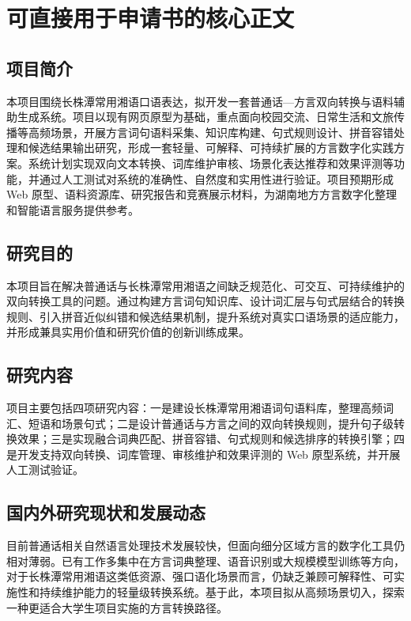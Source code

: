 \documentclass[12pt,a4paper]{ctexart}
\begin{document}
\section{可直接用于申请书的核心正文}

\subsection{项目简介}

本项目围绕长株潭常用湘语口语表达，拟开发一套普通话—方言双向转换与语料辅助生成系统。项目以现有网页原型为基础，重点面向校园交流、日常生活和文旅传播等高频场景，开展方言词句语料采集、知识库构建、句式规则设计、拼音容错处理和候选结果输出研究，形成一套轻量、可解释、可持续扩展的方言数字化实践方案。系统计划实现双向文本转换、词库维护审核、场景化表达推荐和效果评测等功能，并通过人工测试对系统的准确性、自然度和实用性进行验证。项目预期形成 Web 原型、语料资源库、研究报告和竞赛展示材料，为湖南地方方言数字化整理和智能语言服务提供参考。

\subsection{研究目的}

本项目旨在解决普通话与长株潭常用湘语之间缺乏规范化、可交互、可持续维护的双向转换工具的问题。通过构建方言词句知识库、设计词汇层与句式层结合的转换规则、引入拼音近似纠错和候选结果机制，提升系统对真实口语场景的适应能力，并形成兼具实用价值和研究价值的创新训练成果。

\subsection{研究内容}

项目主要包括四项研究内容：一是建设长株潭常用湘语词句语料库，整理高频词汇、短语和场景句式；二是设计普通话与方言之间的双向转换规则，提升句子级转换效果；三是实现融合词典匹配、拼音容错、句式规则和候选排序的转换引擎；四是开发支持双向转换、词库管理、审核维护和效果评测的 Web 原型系统，并开展人工测试验证。

\subsection{国内外研究现状和发展动态}

目前普通话相关自然语言处理技术发展较快，但面向细分区域方言的数字化工具仍相对薄弱。已有工作多集中在方言词典整理、语音识别或大规模模型训练等方向，对于长株潭常用湘语这类低资源、强口语化场景而言，仍缺乏兼顾可解释性、可实施性和持续维护能力的轻量级转换系统。基于此，本项目拟从高频场景切入，探索一种更适合大学生项目实施的方言转换路径。
\end{document}
